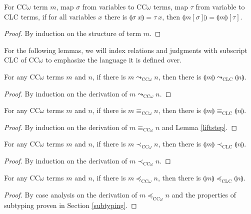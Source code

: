 \documentclass[sigplan,screen,review,anonymous]{acmart}
\newcommand{\step}{\leadsto}
\newcommand{\lift}[1]{\llparenthesis #1 \rrparenthesis}
\begin{document}
\begin{lemma}
  For CC$\omega$ term $m$, map $\sigma$ from variables to CC$\omega$ terms, map $\tau$ from variable to CLC terms, if for all variables $x$ there is $\lift{\sigma\ x} = \tau\ x$, then $\lift{m[\sigma]} = \lift{m}[\tau]$.
\end{lemma}
\begin{proof}
  By induction on the structure of term $m$.
\end{proof}
For the following lemmas, we will index relations and judgments with subscript CLC of CC$\omega$ to emphasize the language it is defined over.

\begin{lemma}\label{liftstep}
  For any CC$\omega$ terms $m$ and $n$, if there is $m \step_{\scriptscriptstyle \text{CC$\omega$}} n$, then there is $\lift{m} \step_{\scriptscriptstyle \text{CLC}} \lift{n}$.
\end{lemma}
\begin{proof}
  By induction on the derivation of $m \step_{\scriptscriptstyle \text{CC$\omega$}} n$.
\end{proof}

\begin{lemma}
  For any CC$\omega$ terms $m$ and $n$, if there is $m \equiv_{\scriptscriptstyle \text{CC$\omega$}} n$, then there is $\lift{m} \equiv_{\scriptscriptstyle \text{CLC}} \lift{n}$.
\end{lemma}
\begin{proof}
  By induction on the derivation of $m \equiv_{\scriptscriptstyle \text{CC$\omega$}} n$ and Lemma \ref{liftstep}.
\end{proof}

\begin{lemma}\label{liftsub1}
  For any CC$\omega$ terms $m$ and $n$, if there is $m \prec_{\scriptscriptstyle \text{CC$\omega$}} n$, then there is $\lift{m} \prec_{\scriptscriptstyle \text{CLC}} \lift{n}$.
\end{lemma}
\begin{proof}
  By induction on the derivation of $m \prec_{\scriptscriptstyle \text{CC$\omega$}} n$.
\end{proof}

\begin{lemma}
  For any CC$\omega$ terms $m$ and $n$, if there is $m \preceq_{\scriptscriptstyle \text{CC$\omega$}} n$, then there is $\lift{m} \preceq_{\scriptscriptstyle \text{CLC}} \lift{n}$.
\end{lemma}
\begin{proof}
  By case analysis on the derivation of $m \preceq_{\scriptscriptstyle \text{CC$\omega$}} n$ and the properties of subtyping proven in Section \ref{subtyping}.
\end{proof}
\end{document}
